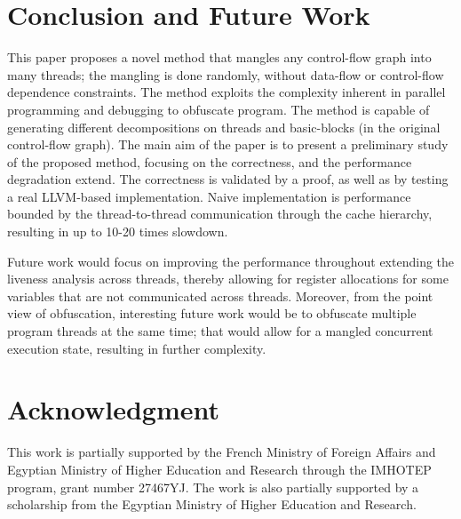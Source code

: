 \documentclass[3p,times,procedia,twocolumn,letterpaper]{elsarticle}
\begin{document}
\section{Conclusion and Future Work}
\label{conclusion}

This paper proposes a novel method that mangles any control-flow graph into many threads; the mangling is done randomly, without data-flow or control-flow dependence constraints. The method exploits the complexity inherent in parallel programming and debugging to obfuscate program. The method is capable of generating   different decompositions on  threads and  basic-blocks (in the original control-flow graph). The main aim of the paper is to present a preliminary study of the proposed method, focusing on the correctness, and the performance degradation extend. The correctness is validated by a proof, as well as by testing a real LLVM-based implementation. Naive implementation is  performance bounded by the thread-to-thread communication through the cache hierarchy, resulting in up to 10-20 times slowdown.

Future work would focus on improving the performance throughout extending the liveness analysis across threads, thereby allowing for register allocations for some variables that are not communicated across threads. Moreover, from the point view of obfuscation, interesting future work would be to obfuscate multiple program threads at the same time; that would allow for a mangled concurrent execution state, resulting in further complexity.

\section{Acknowledgment}
This work is partially supported by the French Ministry of Foreign
Affairs and Egyptian Ministry of Higher Education and Research through the
IMHOTEP program, grant number 27467YJ. The work is also partially supported by a scholarship from the Egyptian Ministry of Higher Education and Research.




\end{document}
